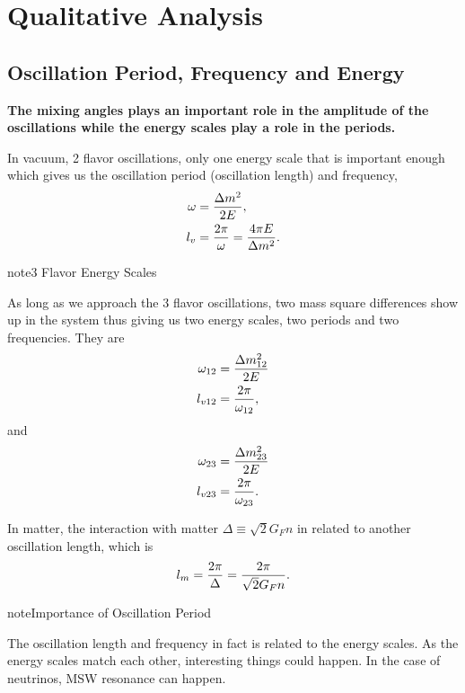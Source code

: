 \documentclass[letterpaper,12pt,english]{sphinxmanual}
\begin{document}
\chapter{Qualitative Analysis}
\label{qualitative:qualitative-analysis}\label{qualitative::doc}

\section{Oscillation Period, Frequency and Energy}
\label{qualitative:oscillation-period-frequency-and-energy}
\textbf{The mixing angles plays an important role in the amplitude of the oscillations while the energy scales play a role in the periods.}

In vacuum, 2 flavor oscillations, only one energy scale that is important enough which gives us the oscillation period (oscillation length) and frequency,
\begin{gather}
\begin{split}\omega &= \frac{\Delta m^2}{2E},\\
l_v &= \frac{2\pi}{\omega} = \frac{4\pi E}{\Delta m^2}.\end{split}\notag
\end{gather}
\begin{notice}{note}{3 Flavor Energy Scales}

As long as we approach the 3 flavor oscillations, two mass square differences show up in the system thus giving us two energy scales, two periods and two frequencies. They are
\begin{gather}
\begin{split}\omega_{12} &= \frac{\Delta m_{12}^2}{2E} \\       l_{v12} & = \frac{2\pi}{\omega_{12}},\end{split}\notag
\end{gather}
and
\begin{gather}
\begin{split}\omega_{23} &= \frac{\Delta m_{23}^2}{2E} \\
l_{v23} & = \frac{2\pi}{\omega_{23}}.\end{split}\notag
\end{gather}\end{notice}

In matter, the interaction with matter \(\Delta \equiv \sqrt{2} G_F n\) in related to another oscillation length, which is
\begin{gather}
\begin{split}l_m = \frac{2\pi}{\Delta} = \frac{2\pi}{\sqrt{2}G_F n} .\end{split}\notag
\end{gather}
\begin{notice}{note}{Importance of Oscillation Period}

The oscillation length and frequency in fact is related to the energy scales. As the energy scales match each other, interesting things could happen. In the case of neutrinos, MSW resonance can happen.
\end{notice}
\end{document}
